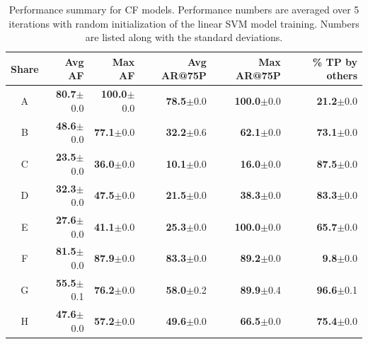\begin{table}[t!]
{\fontsize{8pt}{1em}\selectfont
\begin{center}
\begin{tabular}{|c|r|r|r|r|r|}
		\hline
		\textbf{Share} & \textbf{Avg AF} & \textbf{Max AF} & \textbf{Avg AR@75P} & \textbf{Max AR@75P} & \textbf{\% TP by others} \tabularnewline
		\hline
A&\textbf{80.7}$\pm$0.0&\textbf{100.0}$\pm$0.0&\textbf{78.5}$\pm$0.0&\textbf{100.0}$\pm$0.0&\textbf{21.2}$\pm$0.0\tabularnewline \hline
B&\textbf{48.6}$\pm$0.0&\textbf{77.1}$\pm$0.0&\textbf{32.2}$\pm$0.6&\textbf{62.1}$\pm$0.0&\textbf{73.1}$\pm$0.0\tabularnewline \hline
C&\textbf{23.5}$\pm$0.0&\textbf{36.0}$\pm$0.0&\textbf{10.1}$\pm$0.0&\textbf{16.0}$\pm$0.0&\textbf{87.5}$\pm$0.0\tabularnewline \hline
D&\textbf{32.3}$\pm$0.0&\textbf{47.5}$\pm$0.0&\textbf{21.5}$\pm$0.0&\textbf{38.3}$\pm$0.0&\textbf{83.3}$\pm$0.0\tabularnewline \hline
E&\textbf{27.6}$\pm$0.0&\textbf{41.1}$\pm$0.0&\textbf{25.3}$\pm$0.0&\textbf{100.0}$\pm$0.0&\textbf{65.7}$\pm$0.0\tabularnewline \hline
F&\textbf{81.5}$\pm$0.0&\textbf{87.9}$\pm$0.0&\textbf{83.3}$\pm$0.0&\textbf{89.2}$\pm$0.0&\textbf{9.8}$\pm$0.0\tabularnewline \hline
G&\textbf{55.5}$\pm$0.1&\textbf{76.2}$\pm$0.0&\textbf{58.0}$\pm$0.2&\textbf{89.9}$\pm$0.4&\textbf{96.6}$\pm$0.1\tabularnewline \hline
H&\textbf{47.6}$\pm$0.0&\textbf{57.2}$\pm$0.0&\textbf{49.6}$\pm$0.0&\textbf{66.5}$\pm$0.0&\textbf{75.4}$\pm$0.0\tabularnewline \hline
\end{tabular}
\end{center}
}
\caption{Performance summary for CF models. Performance
  numbers are averaged over 5 iterations with random
  initialization of the linear SVM model training. Numbers are listed
  along with the standard deviations.}
\label{tab:CollabFilteringPerf}  %
\end{table}

